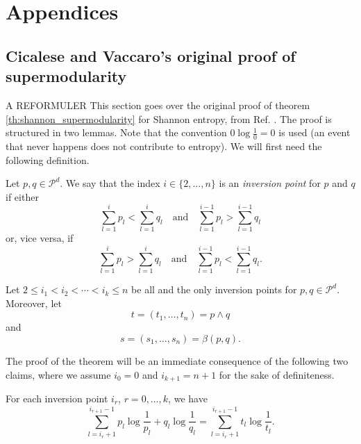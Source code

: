 \appendix
\chapter*{Appendices}
\renewcommand{\thesection}{\Alph{section}}
\renewcommand{\theequation}{\thesection.\arabic{equation}}



\section{Cicalese and Vaccaro's original proof of supermodularity}

A REFORMULER This section goes over the original proof of theorem \ref{th:shannon_supermodularity} for Shannon entropy, from Ref. \cite{cicalese_supermodularity_2002}. The proof is structured in two lemmas. Note that the convention $0 \log \frac{1}{0} = 0$ is used (an event that never happens does not contribute to entropy). We will first need the following definition.

\begin{appendix_definition}
    Let $p, q \in \mathcal{P}^d$. We say that the index $i \in \{2, \ldots, n\}$ is an \emph{inversion point} for $p$ and $q$ if either
\begin{equation}
    \sum_{l=1}^{i} p_l < \sum_{l=1}^{i} q_l \quad \text{and} \quad \sum_{l=1}^{i-1} p_l > \sum_{l=1}^{i-1} q_l    
\end{equation}
or, vice versa, if
\begin{equation}
    \sum_{l=1}^{i} p_l > \sum_{l=1}^{i} q_l \quad \text{and} \quad \sum_{l=1}^{i-1} p_l < \sum_{l=1}^{i-1} q_l.
\end{equation}
\end{appendix_definition}

Let $2 \leq i_1 < i_2 < \cdots < i_k \leq n$ be all and the only inversion points for $p, q \in \mathcal{P}^d$. Moreover, let
\begin{equation}
    t = (t_1, \ldots, t_n) = p \wedge q
\end{equation}
and
\begin{equation}
    s = (s_1, \ldots, s_n) = \beta(p, q).
\end{equation}

The proof of the theorem will be an immediate consequence of the following two claims, where we assume $i_0 = 0$ and $i_{k+1} = n + 1$ for the sake of definiteness. 

\begin{appendix_lemma} \label{lem:shannon_1}
    For each inversion point $i_r$, $r = 0, \ldots, k$, we have
    \begin{equation}
        \sum_{l=i_r+1}^{i_{r+1}-1} p_l \log \frac{1}{p_l} + q_l \log \frac{1}{q_l} = \sum_{l=i_r+1}^{i_{r+1}-1} t_l \log \frac{1}{t_l}.
    \end{equation}
\end{appendix_lemma} 

